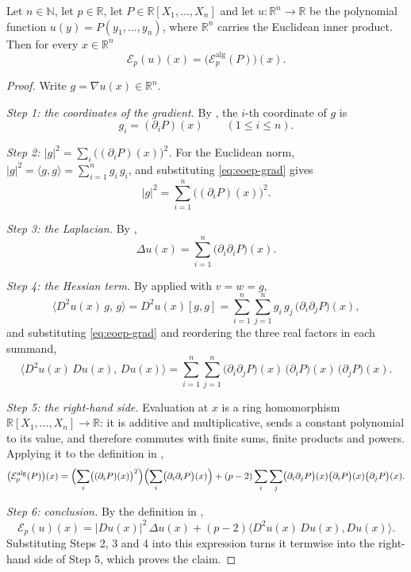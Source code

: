 \begin{lemma}
Let $n\in\mathbb{N}$, let $p\in\mathbb{R}$, let $P\in\mathbb{R}[X_1,\dots,X_n]$
and let $u:\mathbb{R}^n\to\mathbb{R}$ be the polynomial function
$u(y)=P(y_1,\dots,y_n)$, where $\mathbb{R}^n$ carries the Euclidean inner
product. Then for every $x\in\mathbb{R}^n$
\[
  \mathcal{E}_p(u)(x)=\bigl(\mathcal{E}^{\mathrm{alg}}_p(P)\bigr)(x).
\]
\end{lemma}
\begin{proof}
Write $g=\nabla u(x)\in\mathbb{R}^n$.

\emph{Step 1: the coordinates of the gradient.} By ,
the $i$-th coordinate of $g$ is
\begin{equation}\label{eq:eoep-grad}
  g_i=(\partial_iP)(x)\qquad(1\le i\le n).
\end{equation}

\emph{Step 2: $\lvert g\rvert^2=\sum_i\bigl((\partial_iP)(x)\bigr)^2$.} For the
Euclidean norm, $\lvert g\rvert^2=\langle g,g\rangle=\sum_{i=1}^{n}g_i\,g_i$,
and substituting \eqref{eq:eoep-grad} gives
\[
  \lvert g\rvert^2=\sum_{i=1}^{n}\bigl((\partial_iP)(x)\bigr)^2 .
\]

\emph{Step 3: the Laplacian.} By ,
\[
  \Delta u(x)=\sum_{i=1}^{n}\bigl(\partial_i\partial_iP\bigr)(x).
\]

\emph{Step 4: the Hessian term.} By  applied with
$v=w=g$,
\[
  \bigl\langle D^2u(x)\,g,\,g\bigr\rangle=D^2u(x)[g,g]
  =\sum_{i=1}^{n}\sum_{j=1}^{n}g_i\,g_j\,\bigl(\partial_i\partial_jP\bigr)(x),
\]
and substituting \eqref{eq:eoep-grad} and reordering the three real factors in
each summand,
\[
  \bigl\langle D^2u(x)\,Du(x),\,Du(x)\bigr\rangle
  =\sum_{i=1}^{n}\sum_{j=1}^{n}
     \bigl(\partial_i\partial_jP\bigr)(x)\,\bigl(\partial_iP\bigr)(x)\,
     \bigl(\partial_jP\bigr)(x).
\]

\emph{Step 5: the right-hand side.} Evaluation at $x$ is a ring homomorphism
$\mathbb{R}[X_1,\dots,X_n]\to\mathbb{R}$: it is additive and multiplicative,
sends a constant polynomial to its value, and therefore commutes with finite
sums, finite products and powers. Applying it to the definition in
,
\[
  \bigl(\mathcal{E}^{\mathrm{alg}}_p(P)\bigr)(x)
  =\Bigl(\sum_{i}\bigl((\partial_iP)(x)\bigr)^2\Bigr)
    \Bigl(\sum_{i}\bigl(\partial_i\partial_iP\bigr)(x)\Bigr)
   +(p-2)\sum_{i}\sum_{j}
      \bigl(\partial_i\partial_jP\bigr)(x)\bigl(\partial_iP\bigr)(x)
      \bigl(\partial_jP\bigr)(x).
\]

\emph{Step 6: conclusion.} By the definition in ,
\[
  \mathcal{E}_p(u)(x)=\lvert Du(x)\rvert^2\,\Delta u(x)
    +(p-2)\bigl\langle D^2u(x)\,Du(x),Du(x)\bigr\rangle .
\]
Substituting Steps 2, 3 and 4 into this expression turns it termwise into the
right-hand side of Step 5, which proves the claim.
\end{proof}
